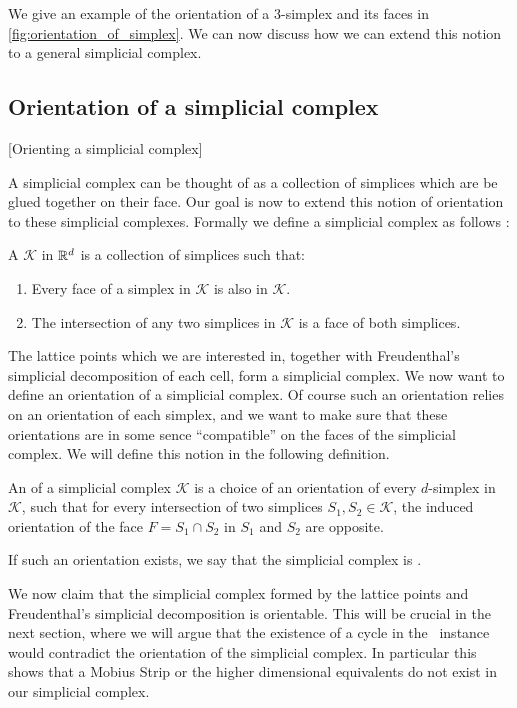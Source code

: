 We give an example of the orientation of a 3-simplex and its faces in \cref{fig:orientation_of_simplex}. We can now discuss how we can extend this notion to a general simplicial complex.

\subsection{Orientation of a simplicial complex}[Orienting a simplicial complex]

A simplicial complex can be thought of as a collection of simplices which are be glued together on their face. Our goal is now to extend this notion of orientation to these simplicial complexes. Formally we define a simplicial complex as follows :

\begin{definition}
	A  $\mathcal{K}$ in $\mathbb{R}^d$ is a collection of simplices such that:
	\begin{enumerate}
		\item Every face of a simplex in $\mathcal{K}$ is also in $\mathcal{K}$.
		\item The intersection of any two simplices in $\mathcal{K}$ is a face of both simplices.
	\end{enumerate}
\end{definition}

The lattice points which we are interested in, together with Freudenthal's simplicial decomposition of each cell, form a simplicial complex. We now want to define an orientation of a simplicial complex. Of course such an orientation relies on an orientation of each simplex, and we want to make sure that these orientations are in some sence ``compatible'' on the faces of the simplicial complex. We will define this notion in the following definition.

\begin{definition}
	An  of a simplicial complex $\mathcal{K}$ is a choice of an orientation of every $d$-simplex in $\mathcal{K}$, such that for every intersection of two simplices $S_1, S_2 \in \mathcal{K}$, the induced orientation of the face $F = S_1 \cap S_2$ in $S_1$ and $S_2$ are opposite. \par
	If such an orientation exists, we say that the simplicial complex is .
\end{definition}

We now claim that the simplicial complex formed by the lattice points and Freudenthal's simplicial decomposition is orientable. This will be crucial in the next section, where we will argue that the existence of a cycle in the \EndOfLine\ instance would contradict the orientation of the simplicial complex. In particular this shows that a Mobius Strip or the higher dimensional equivalents do not exist in our simplicial complex.

